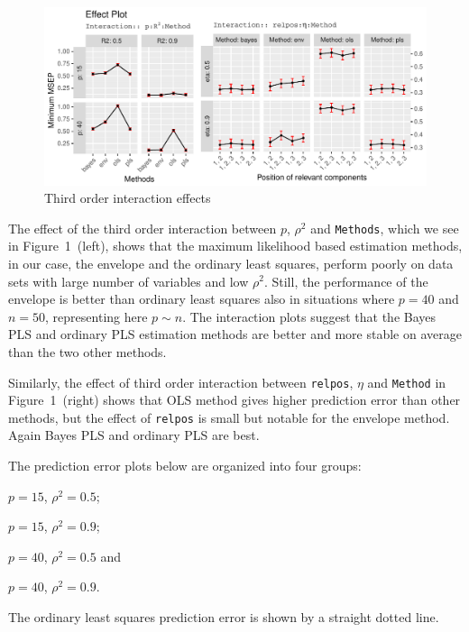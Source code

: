 \documentclass[num-refs]{wiley-article}
\begin{document}
\begin{figure}[!ht]
\centering
\includegraphics[width=\textwidth]{effect-plot}
\caption{Third order interaction effects}
\label{fig:effect-plot}
\end{figure}

The effect of the third order interaction between $p$, $\rho^2$ and {\tt Methods}, which we see in Figure~1~(left), shows that the maximum likelihood based estimation methods, in our case, the envelope and the ordinary least squares, perform poorly on data sets with large number of variables and low $\rho^2$. Still, the performance of the envelope is better than ordinary least squares also in situations where $p=40$ and $n=50$, representing here $p\sim n$. The interaction plots suggest that the Bayes PLS and ordinary PLS estimation methods are better and more stable on average than the two other methods.

Similarly, the effect of third order interaction between {\tt relpos}, $\eta$ and {\tt Method} in Figure~1~(right) shows that OLS method gives higher prediction error than other methods, but the effect of {\tt relpos} is small but notable for the envelope method. Again Bayes PLS and ordinary PLS are best.

The prediction error plots below are organized into four groups:
\begin{enumerate*}[label = \alph*)]
\item \label{lst:g1} $p = 15$, $\rho^2 = 0.5$;
\item \label{lst:g2} $p = 15$, $\rho^2 = 0.9$;
\item \label{lst:g3} $p = 40$, $\rho^2 = 0.5$ and
\item \label{lst:g4} $p = 40$, $\rho^2 = 0.9$.
\end{enumerate*}
The ordinary least squares prediction error is shown by a straight dotted line.

\end{document}
